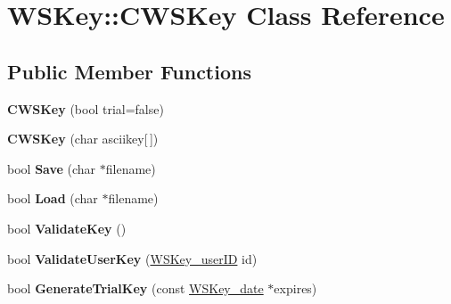 \hypertarget{class_w_s_key_1_1_c_w_s_key}{
\section{WSKey::CWSKey Class Reference}
\label{class_w_s_key_1_1_c_w_s_key}
}
\subsection*{Public Member Functions}
\begin{DoxyCompactItemize}
\item 
\hypertarget{class_w_s_key_1_1_c_w_s_key_a3a698e7aedbbf2f3634a23c574f8292b}{
{\bfseries CWSKey} (bool trial=false)}
\label{class_w_s_key_1_1_c_w_s_key_a3a698e7aedbbf2f3634a23c574f8292b}

\item 
\hypertarget{class_w_s_key_1_1_c_w_s_key_a25ab872be0728da06437981d0e544d46}{
{\bfseries CWSKey} (char asciikey\mbox{[}$\,$\mbox{]})}
\label{class_w_s_key_1_1_c_w_s_key_a25ab872be0728da06437981d0e544d46}

\item 
\hypertarget{class_w_s_key_1_1_c_w_s_key_ac8b7cb913ad49ae3dbe3dd9648b9e1d2}{
bool {\bfseries Save} (char $\ast$filename)}
\label{class_w_s_key_1_1_c_w_s_key_ac8b7cb913ad49ae3dbe3dd9648b9e1d2}

\item 
\hypertarget{class_w_s_key_1_1_c_w_s_key_a3f6e205193bb30f13a0560695e9918d5}{
bool {\bfseries Load} (char $\ast$filename)}
\label{class_w_s_key_1_1_c_w_s_key_a3f6e205193bb30f13a0560695e9918d5}

\item 
\hypertarget{class_w_s_key_1_1_c_w_s_key_ad2d5b2ad55bf3044b0e227992aa6546b}{
bool {\bfseries ValidateKey} ()}
\label{class_w_s_key_1_1_c_w_s_key_ad2d5b2ad55bf3044b0e227992aa6546b}

\item 
\hypertarget{class_w_s_key_1_1_c_w_s_key_ac630898ccd4d3bb0c23d5d5664781310}{
bool {\bfseries ValidateUserKey} (\hyperlink{struct_w_s_key_1_1_w_s_key__user_i_d}{WSKey\_\-userID} id)}
\label{class_w_s_key_1_1_c_w_s_key_ac630898ccd4d3bb0c23d5d5664781310}

\item 
\hypertarget{class_w_s_key_1_1_c_w_s_key_af632c7e8a036ead94b165034847557dd}{
bool {\bfseries GenerateTrialKey} (const \hyperlink{struct_w_s_key_1_1_w_s_key__date}{WSKey\_\-date} $\ast$expires)}
\label{class_w_s_key_1_1_c_w_s_key_af632c7e8a036ead94b165034847557dd}


\end{DoxyCompactItemize}
